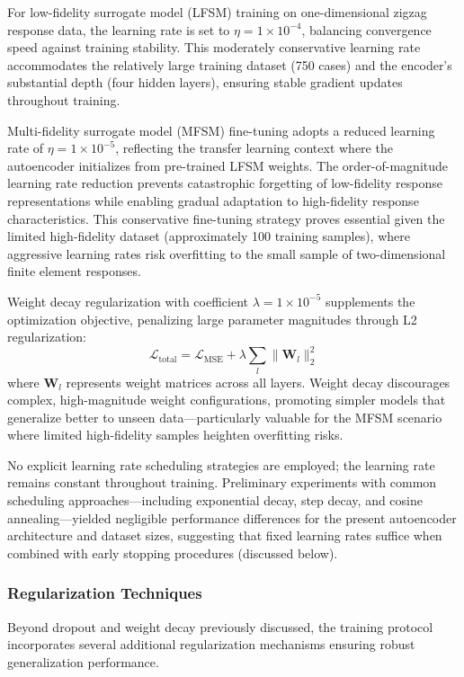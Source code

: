 \documentclass[12pt,a4paper]{report}
\begin{document}
For low-fidelity surrogate model (LFSM) training on one-dimensional zigzag response data, the learning rate is set to $\eta = 1 \times 10^{-4}$, balancing convergence speed against training stability. This moderately conservative learning rate accommodates the relatively large training dataset (750 cases) and the encoder's substantial depth (four hidden layers), ensuring stable gradient updates throughout training.

Multi-fidelity surrogate model (MFSM) fine-tuning adopts a reduced learning rate of $\eta = 1 \times 10^{-5}$, reflecting the transfer learning context where the autoencoder initializes from pre-trained LFSM weights. The order-of-magnitude learning rate reduction prevents catastrophic forgetting of low-fidelity response representations while enabling gradual adaptation to high-fidelity response characteristics. This conservative fine-tuning strategy proves essential given the limited high-fidelity dataset (approximately 100 training samples), where aggressive learning rates risk overfitting to the small sample of two-dimensional finite element responses.

Weight decay regularization with coefficient $\lambda = 1 \times 10^{-5}$ supplements the optimization objective, penalizing large parameter magnitudes through L2 regularization:
\[
\mathcal{L}_{\text{total}} = \mathcal{L}_{\text{MSE}} + \lambda \sum_{l} \|\mathbf{W}_l\|_2^2
\]
where $\mathbf{W}_l$ represents weight matrices across all layers. Weight decay discourages complex, high-magnitude weight configurations, promoting simpler models that generalize better to unseen data—particularly valuable for the MFSM scenario where limited high-fidelity samples heighten overfitting risks.

No explicit learning rate scheduling strategies are employed; the learning rate remains constant throughout training. Preliminary experiments with common scheduling approaches—including exponential decay, step decay, and cosine annealing—yielded negligible performance differences for the present autoencoder architecture and dataset sizes, suggesting that fixed learning rates suffice when combined with early stopping procedures (discussed below).

\subsubsection{Regularization Techniques}

Beyond dropout and weight decay previously discussed, the training protocol incorporates several additional regularization mechanisms ensuring robust generalization performance.
\end{document}
